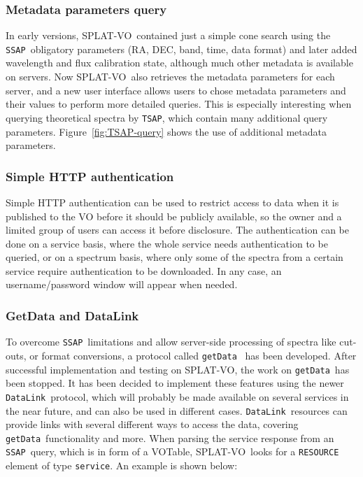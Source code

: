 \documentclass[final,authoryear,5p,times,twocolumn]{elsarticle}
\newcommand{\datalink}{\texttt{DataLink}}
\newcommand{\ssap}{\texttt{SSAP}}
\newcommand{\tsap}{\texttt{TSAP}}
\newcommand{\getdata}{\texttt{getData}}
\newcommand{\votable}{VOTable}
\newcommand{\splatvo}{{\textsf{\small{SPLAT-VO}}}}
\begin{document}
\subsubsection{Metadata parameters query}
%
In early versions, \splatvo\ contained just a simple cone search using the
\ssap\ obligatory parameters (RA, DEC, band, time, data format) and later added
wavelength and flux calibration state, although much other metadata is
available on servers.  Now \splatvo\ also retrieves the metadata parameters for
each server, and a new user interface allows users to chose metadata parameters
and their values to perform more detailed queries.  This is especially
interesting when querying theoretical spectra by \tsap, which contain many
additional query parameters. Figure~\ref{fig:TSAP-query} shows the use of
additional metadata parameters.

\subsubsection{Simple HTTP authentication}
%
Simple HTTP authentication can be used to restrict access to data when it is
published to the VO before it should be publicly available, so the owner and a
limited group of users can access it before disclosure. The authentication can
be done on a service basis, where the whole service needs authentication to be
queried, or on a spectrum basis, where only some of the spectra from a certain
service require authentication to be downloaded. In any case, an
username/password window will appear when needed.

\subsubsection{GetData and DataLink}
%
To overcome \ssap\ limitations and allow server-side processing of spectra like
cut-outs, or format conversions, a protocol called \getdata\ \citep{getData}
has been developed. After successful implementation and testing on \splatvo,
the work on \getdata\ has been stopped. It has been decided to implement these
features using the newer \datalink\ protocol, which will probably be made
available on several services in the near future, and can also be used in
different cases.  \datalink\ resources can provide links with several different
ways to access the data, covering \getdata\ functionality and more.  When
parsing the service response from an \ssap\ query, which is in form of a
\votable, \splatvo\ looks for a \texttt{RESOURCE} element of type
\texttt{service}.  An example is shown below:
\end{document}
